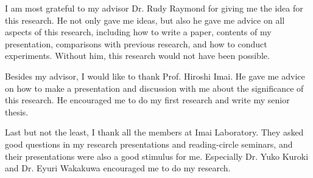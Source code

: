 \begin{acknowledge}

\par I am most grateful to my advisor Dr. Rudy Raymond for giving me the idea for this research. He not only gave me ideas, but also he gave me advice on all aspects of this research, including how to write a paper, contents of my presentation, comparisons with previous research, and how to conduct experiments. Without him, this research would not have been possible.

\par Besides my advisor, I would like to thank Prof. Hiroshi Imai. He gave me advice on how to make a presentation and discussion with me about the significance of this research. He encouraged me to do my first research and write my senior thesis.

\par Last but not the least, I thank all the members at Imai Laboratory. They asked good questions in my research presentations and reading-circle seminars, and their presentations were also a good stimulus for me. Especially Dr. Yuko Kuroki and Dr. Eyuri Wakakuwa encouraged me to do my research.

\end{acknowledge}
